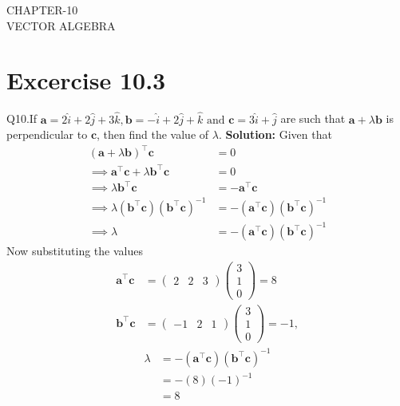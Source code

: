 \documentclass[12pt]{article}
\newcommand{\solution}{\noindent \textbf{Solution: }}
\newcommand{\myvec}[1]{\ensuremath{\begin{pmatrix}#1\end{pmatrix}}}
\let\vec\mathbf
\begin{document}
\begin{center}
\textbf\large{CHAPTER-10 \\ VECTOR ALGEBRA}

\end{center}
\section*{Excercise 10.3}

Q10.If $\vec{a} = 2\hat{i}+2\hat{j}+3\hat{k}, \vec{b} = -\hat{i}+2\hat{j}+\hat{k} \text{ and } \vec{c} = 3\hat{i}+\hat{j}$ are such that $\vec{a}+\lambda \vec{b}$ is perpendicular to $\vec{c}$, then find the value of $\lambda$.
\fi
\solution
Given that
\begin{align}
	(\vec{a}+\lambda \vec{b})^{\top} \vec{c} &= 0\\
\implies \vec{a}^{\top}\vec{c}+\lambda \vec{b}^{\top}\vec{c}&=0\\
\implies 	\lambda \vec{b}^{\top}\vec{c}&=-\vec{a}^{\top}\vec{c}\\
\implies 	\lambda(\vec{b}^{\top}\vec{c})(\vec{b}^{\top}\vec{c})^{-1}&=-(\vec{a}^{\top}\vec{c})(\vec{b}^{\top}\vec{c})^{-1}\\
\implies 	\lambda&=-(\vec{a}^{\top}\vec{c})(\vec{b}^{\top}\vec{c})^{-1}
\end{align}
Now substituting the values
\begin{align}
	\vec{a}^{\top}\vec{c}&=\myvec{2&2&3} \myvec{3\\1\\0} = 8\\
	\vec{b}^{\top}\vec{c}&=\myvec{-1&2&1} \myvec{3\\1\\0} = -1,
\end{align}
\begin{align}
	\lambda&=-(\vec{a}^{\top}\vec{c})(\vec{b}^{\top}\vec{c})^{-1}\\
	&=-(8)(-1)^{-1}\\
	&=8
\end{align}
\end{document}

